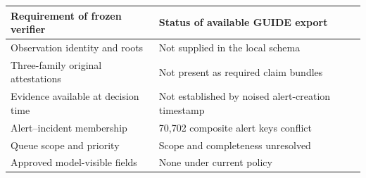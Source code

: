 \begin{tabularx}{\linewidth}{p{5.3cm}X}
\toprule
Requirement of frozen verifier & Status of available GUIDE export \\
\midrule
Observation identity and roots & Not supplied in the local schema \\
Three-family original attestations & Not present as required claim bundles \\
Evidence available at decision time & Not established by noised alert-creation timestamp \\
Alert--incident membership & 70,702 composite alert keys conflict \\
Queue scope and priority & Scope and completeness unresolved \\
Approved model-visible fields & None under current policy \\
\bottomrule
\end{tabularx}
